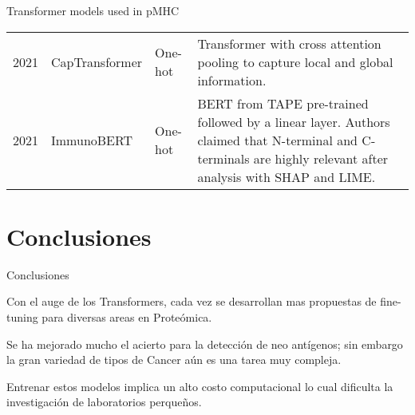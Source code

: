 \documentclass[10pt]{beamer}
\newcommand{\1}{
	\setbeamertemplate{background}{
		\texttt{[image: ../img/1]}
		\tikz[overlay] \fill[fill opacity=0.75,fill=white] (0,0) rectangle (-\paperwidth,\paperheight);
	}
}
\begin{document}
\begin{frame}{Transformer models used in pMHC}{}
\begin{table}[h]
{\begin{tabular}{p{1cm}p{1cm}p{1cm}p{6cm}}
			2021\cite{chen2021jointly}  & CapTransformer            & One-hot   &  Transformer with cross attention pooling to capture local and global information.  \\
			
			2021\cite{gasser2021interpreting}  & ImmunoBERT            & One-hot                     & BERT from TAPE pre-trained followed by a linear layer. Authors claimed that N-terminal and C-terminals are highly relevant after analysis with SHAP and LIME.   \\
			
			                   
		\end{tabular}
}
\end{table}
	
\end{frame}

\section{Conclusiones}


\begin{frame}{Conclusiones}{}
	\begin{block}{}
		Con el auge de los Transformers, cada vez se desarrollan mas propuestas de fine-tuning para diversas areas en Proteómica.
	\end{block}


	\begin{block}{}
		Se ha mejorado mucho el acierto para la detección de neo antígenos; sin embargo la gran variedad de tipos de Cancer aún es una tarea muy compleja.
	\end{block}

	\begin{block}{}
		Entrenar estos modelos implica un alto costo computacional lo cual dificulta la investigación de laboratorios perqueños.
	\end{block}
\end{frame}
\end{document}
